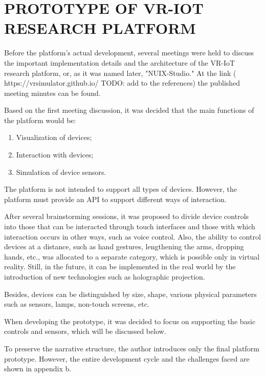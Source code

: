 
\chapter{PROTOTYPE OF VR-IOT RESEARCH PLATFORM}

Before the platform's actual development, several meetings were held to discuss the important implementation details and the architecture of the VR-IoT research platform, or, as it was named later, "NUIX-Studio." At the link ( https://vrsimulator.github.io/ TODO: add to the references)  the published meeting minutes can be found. 

Based on the first meeting discussion, it was decided that the main functions of the platform would be:
\begin{enumerate}
     \item Visualization of devices;
     \item Interaction with devices;
     \item Simulation of device sensors.
\end{enumerate}

The platform is not intended to support all types of devices. However, the platform must provide an API to support different ways of interaction.

After several brainstorming sessions, it was proposed to divide device controls into those that can be interacted through touch interfaces and those with which interaction occurs in other ways, such as voice control. Also, the ability to control devices at a distance, such as hand gestures, lengthening the arms, dropping hands, etc., was allocated to a separate category, which is possible only in virtual reality. Still, in the future, it can be implemented in the real world by the introduction of new technologies such as holographic projection.

Besides, devices can be distinguished by size, shape, various physical parameters such as sensors, lamps, non-touch screens, etc.

When developing the prototype, it was decided to focus on supporting the basic controls and sensors, which will be discussed below.

To preserve the narrative structure, the author introduces only the final platform prototype. However, the entire development cycle and the challenges faced are shown in appendix b.

